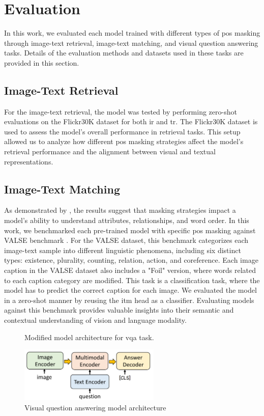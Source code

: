 \section{Evaluation}
In this work, we evaluated each model trained with different types of \acrshort{pos} masking through image-text retrieval, image-text matching, and visual question answering tasks.  
Details of the evaluation methods and datasets used in these tasks are provided in this section.  

\subsection{Image-Text Retrieval}
For the image-text retrieval, the model was tested by performing zero-shot evaluations on the Flickr30K \cite{flickr30k} dataset for both \acrfull{ir} and \acrfull{tr}.  
The Flickr30K dataset is used to assess the model's overall performance in retrieval tasks.
This setup allowed us to analyze how different \acrshort{pos} masking strategies affect the model's retrieval performance and the alignment between visual and textual representations.  

\subsection{Image-Text Matching}
As demonstrated by , the results suggest that masking strategies impact a model’s ability to understand attributes, relationships, and word order.  
In this work, we benchmarked each pre-trained model with specific \acrshort{pos} masking against VALSE benchmark \cite{valse}.  
For the VALSE dataset, this benchmark categorizes each image-text sample into different linguistic phenomena, including six distinct types: existence, plurality, counting, relation, action, and coreference.  
Each image caption in the VALSE dataset also includes a "Foil" version, where words related to each caption category are modified.  
This task is a classification task, where the model has to predict the correct caption for each image.
We evaluated the model in a zero-shot manner by reusing the \acrshort{itm} head as a classifier.
Evaluating models against this benchmark provides valuable insights into their semantic and contextual understanding of vision and language modality.  

\begin{figure}[h]
    \caption{Visual question answering model architecture}
    \label{fig:vqa}
    Modified model architecture for \acrshort{vqa} task.
    \begin{center}
        \includegraphics[width=0.6\textwidth]{Images/vqa_method.png}
    \end{center}
    \small
\end{figure}

